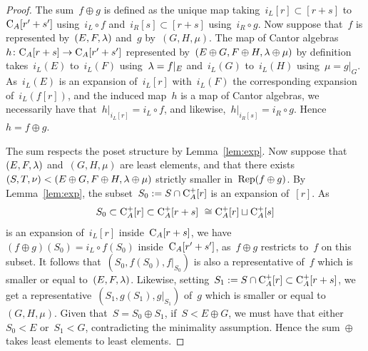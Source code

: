 \begin{proof}
The sum~$f\oplus g$ is defined as the unique map taking~$i_L[r]\subset [r+s]$ to~$\mathrm{C}_A[r'+s']$ using~$i_L\circ f$ and~\hbox{$i_R[s]\subset [r+s]$} using~$i_R\circ g$. 
Now suppose that~$f$ is represented by~$(E,F,\lambda)$ and~$g$ by~$(G,H,\mu)$. The map of Cantor algebras~$h\colon\mathrm{C}_A[r+s]\to \mathrm{C}_A[r'+s']$ represented by~$(E\oplus G,F\oplus H,\lambda\oplus \mu)$ by definition takes~$i_L(E)$ to~$i_L(F)$ using~$\lambda=f|_{E}$ and~$i_L(G)$ to~$i_L(H)$ using~$\mu=g|_{G}$. As~$i_L(E)$ is an expansion of~$i_L[r]$ with~$i_L(F)$ the corresponding expansion of~$i_L(f[r])$, and the induced map~$h$ is a map of Cantor algebras, we necessarily have that~$h|_{i_L[r]}=i_L\circ f$, and likewise,~$h|_{i_R[s]}=i_R\circ g$. Hence~$h=f\oplus g$. 


The sum respects the poset structure by Lemma~\ref{lem:exp}. Now suppose that~$(E,F,\lambda)$ and~$(G,H,\mu)$ are  least elements, and that there exists~$(S,T,\nu)<(E\oplus G,F\oplus H,\lambda\oplus \mu)$ strictly smaller in~$ \operatorname{Rep}(f\oplus g)$.
By Lemma~\ref{lem:exp}, the subset~$S_0:=S\cap \mathrm{C}^+_A[r]$ is an expansion of~$[r]$. As~
$$S_0\subset \mathrm{C}^+_A[r]\subset\mathrm{C}^+_A[r+s] \ \cong \mathrm{C}_A^+[r]\sqcup \mathrm{C}_A^+[s]$$
is an expansion of~$i_L[r]$ inside~$\mathrm{C}_A[r+s]$, we have~$(f\oplus g)(S_0)=i_L\circ f(S_0)$ inside~$\mathrm{C}_A[r'+s']$, as~$f\oplus g$ restricts to~$f$ on this subset. It follows that~$(S_0,f(S_0),f|_{S_0})$ is also a representative of~$f$ which is smaller or equal to~$(E,F,\lambda)$. Likewise, setting~\hbox{$S_1:=S\cap \mathrm{C}^+_A[r]\subset\mathrm{C}^+_A[r+s]$}, we get a 
representative~$(S_1,g(S_1),g|_{S_1})$ of~$g$ which is smaller or equal to~$(G,H,\mu)$. Given that~\hbox{$S=S_0\oplus S_1$}, if~$S< E\oplus G$, we must have that either~$S_0<E$ or~\hbox{$S_1<G$}, contradicting the minimality assumption. Hence the sum~$\oplus$ takes least elements to least elements. 
\end{proof}

